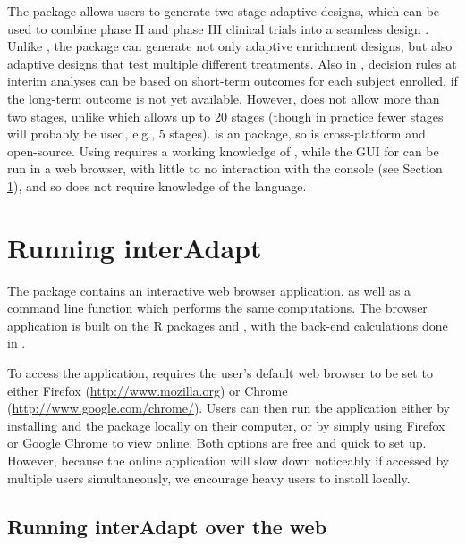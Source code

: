 \documentclass[article]{jss}
\begin{document}
The  package allows  users to generate  two-stage adaptive designs, which can be used to combine phase II and phase III clinical trials into a seamless design \citep{parsons2012r}. Unlike , the  package can generate  not only adaptive enrichment designs, but also adaptive designs that test multiple different treatments. Also in , decision rules at interim analyses can be based on short-term outcomes for each subject enrolled, if the long-term outcome is not yet available. However,  does not allow more than two stages, unlike   which allows up to 20 stages (though in practice fewer stages will probably be used, e.g., 5 stages).  is an   package, so is cross-platform and open-source. Using 
 requires a working knowledge of , while the GUI for  can be run in a web browser, with little to no interaction with the  console (see Section \ref{sec:running-interAdapt}), and so does not require knowledge of the  language.

\section{Running interAdapt }
\label{sec:running-interAdapt}


The   package contains an interactive web browser application, as well as a command line function which performs the same computations. The browser application is built on the R packages  \citep{shiny2013manual} and  \citep{RCurlManual}, with the back-end calculations done in .

To access the  application,  requires the user's default web browser to be set to either Firefox (\url{http://www.mozilla.org}) or Chrome (\url{http://www.google.com/chrome/}). Users can then run the application either by installing  and the  package locally on their computer, or by simply using Firefox or Google Chrome to view  online. Both options are free and quick to set up. However, because the online application will slow down noticeably if accessed by multiple users simultaneously, we encourage heavy users to install  locally.


\subsection{Running interAdapt over the web}
\label{sub:running-online}
\end{document}
